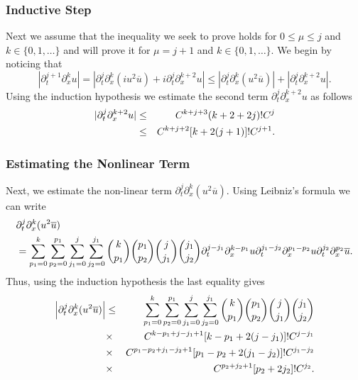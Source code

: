 \documentclass{beamer}
\numberwithin{equation}{section}
\begin{document}
%
%
\begin{frame}
  \frametitle{Inductive Step}
Next we assume that the
inequality we seek to prove holds for $0\le \mu \le j$ and $k\in \{0,1,\dots\}$
and will prove it for $\mu =j+1$ and $k\in \{0,1,\dots\}$.
%
We begin by noticing that
%
\begin{equation*}
|\partial_t^{j+1}\partial_x^k u| = |\partial_t^j\partial_x^k
(i u^2\overline{u})+i\partial_t^j\partial_x^{k+2}u| \le
|\partial_t^j\partial_x^k
(u^2\overline{u})|+|\partial_t^j\partial_x^{k +2}u|.
\end{equation*}
%
Using the induction hypothesis we estimate the second  term
$\partial_t^j\partial_x^{k +2}u$ as follows
%
\begin{eqnarray*}
|\partial_t^j\partial_x^{k +2}u|&\le&
C^{k+j+3}(k+2+2 j)! C^j\notag\\
& \le &C^{k+j+2}[k+2(j+1)]! C^{j+1}.
\end{eqnarray*}
%
\end{frame}
\begin{frame}
  \frametitle{Estimating the Nonlinear Term}
 Next, we estimate  the non-linear term $\partial_t^j\partial_x^k (u^2\overline{u})$.
Using Leibniz's formula  we can write
%
\begin{align*}
& \partial_t^j\partial_x^k (u^2 \overline{u})
\\
& = \sum_{p_1=0}^k\sum_{p_2=0}^{p_1}
\sum_{j_1=0}^j\sum_{j_2=0}^{j_1}\binom{k}{p_1}\binom{p_1}{p_2}
\binom{j}{j_1}\binom{j_1}{j_2}
\partial_t^{j-j_1}\partial_x^{k-p_1}u
\partial_t^{j_1-j_2}\partial_x^{p_1-p_2}u
 \partial_t^{j_2}
\partial_x^{p_2}\overline{u}.\notag
\end{align*}
%
Thus, using  the induction hypothesis  the last equality gives
%
\begin{eqnarray*}
\left \vert \partial_t^j\partial_x^k (u^2 \overline{u})\right \vert
&\le&\sum_{p_1=0}^k\sum_{p_2=0}^{p_1}
\sum_{j_1=0}^j\sum_{j_2=0}^{j_1}\binom{k}{p_1}\binom{p_1}{p_2}
\binom{j}{j_1}\binom{j_1}{j_2}\notag\\
&\times&C^{k-p_1+j-j_1+1}[k-p_1+2(j-j_1)]!C^{j-j_1}\notag\\
&\times&C^{p_1-p_2+j_1-j_2+1}[p_1-p_2+2(j_1-j_2)]!C^{j_1-j_2}\notag\\
&\times&C^{p_2+j_2+1}[p_2+2j_2]!C^{j_2}.\notag
\end{eqnarray*}
%
\end{frame}
%
%
\end{document}
